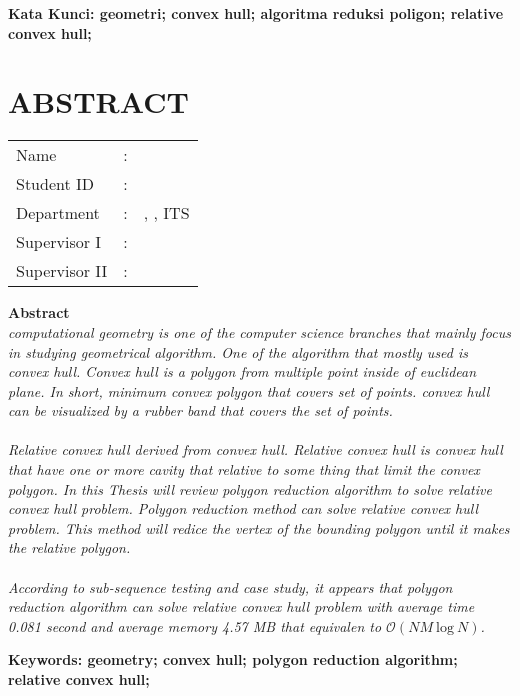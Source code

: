 \vspace*{1em}
\noindent\bfseries Kata Kunci: geometri; convex hull; algoritma reduksi poligon; relative convex hull;
\normalfont
\cleardoublepage

\chapter {ABSTRACT}
\noindent\textbf{\MakeUppercase\juduleng}
\vspace*{1em}

\begin{tabularx}{\linewidth}{ l l p{2.2in} }
	Name 			& : & \penulis \\
	Student ID		& :	& \nrp \\
	Department 		& : & \jurusaneng, \newline \fakultaseng, ITS \\
	Supervisor I 	& : & \pembimbingsatu \\
	Supervisor II 	& : & \pembimbingdua
	\vspace*{1em} 	%
\end {tabularx}
	
\noindent\textbf{Abstract} \\
\itshape
computational geometry is one of the computer science branches that mainly focus in studying geometrical algorithm. One of the algorithm that mostly used is convex hull. Convex hull is a polygon from multiple point inside of euclidean plane. In short, minimum convex polygon that covers set of points. convex hull can be visualized by a rubber band that covers the set of points.\\\\
Relative convex hull derived from convex hull. Relative convex hull is convex hull that have one or more cavity that relative to some thing that limit the convex polygon. In this Thesis will review polygon reduction algorithm to solve relative convex hull problem. Polygon reduction method can solve relative convex hull problem. This method will redice the vertex of the bounding polygon until it makes the relative polygon. \\\\
According to sub-sequence testing and case study, it appears that polygon reduction algorithm can solve relative convex hull problem with average time 0.081 second and average memory 4.57 MB that equivalen to $\mathcal{O}{(NM\ \text{log}\ N)}$.

\vspace*{1em}
\noindent\bfseries Keywords: geometry; convex hull; polygon reduction algorithm; relative convex hull;
\normalfont
\cleardoublepage